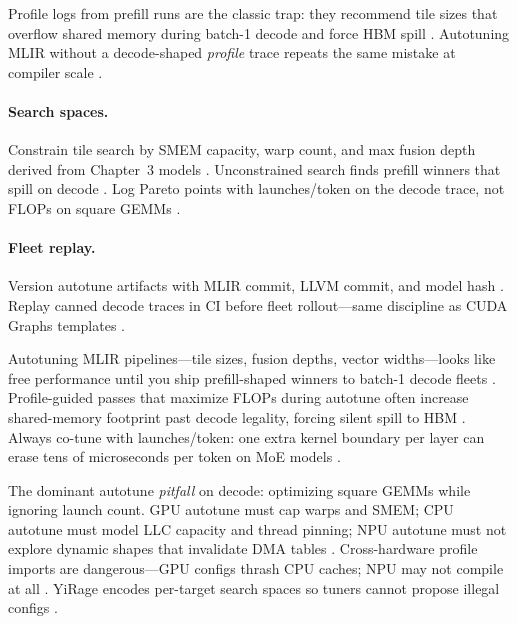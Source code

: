Profile logs from prefill runs are the classic trap: they recommend tile sizes that overflow shared memory during batch-1 decode and force HBM spill \citep{memoryfloor2026,semianalysis2024tma}. Autotuning MLIR without a decode-shaped \emph{profile} trace repeats the same mistake at compiler scale \citep{taxbreak2026,chen2020compilerbasedhardw}.
\label{sec:ch14_mlir_tuning}

\paragraph{Search spaces.} Constrain tile search by SMEM capacity, warp count, and max fusion depth derived from Chapter~3 models \citep{nvidia2022hopper,amd2024xdna,yirage2026}. Unconstrained search finds prefill winners that spill on decode \citep{memoryfloor2026,semianalysis2024tma}. Log Pareto points with launches/token on the decode trace, not FLOPs on square GEMMs \citep{taxbreak2026,patel2025llminference}.

\paragraph{Fleet replay.} Version autotune artifacts with MLIR commit, LLVM commit, and model hash \citep{chen2020compilerbasedhardw,liu2024deepseekv3}. Replay canned decode traces in CI before fleet rollout---same discipline as CUDA Graphs templates \citep{nvidia2024cudagraphs,memoryfloor2026,taxbreak2026}.

Autotuning MLIR pipelines---tile sizes, fusion depths, vector widths---looks like free performance until you ship prefill-shaped winners to batch-1 decode fleets \citep{memoryfloor2026,chen2020compilerbasedhardw}. Profile-guided passes that maximize FLOPs during autotune often increase shared-memory footprint past decode legality, forcing silent spill to HBM \citep{taxbreak2026,semianalysis2024tma}. Always co-tune with launches/token: one extra kernel boundary per layer can erase tens of microseconds per token on MoE models \citep{liu2024deepseekv3,taxbreak2026}.

The dominant autotune \emph{pitfall} on decode: optimizing square GEMMs while ignoring launch count. GPU autotune must cap warps and SMEM; CPU autotune must model LLC capacity and thread pinning; NPU autotune must not explore dynamic shapes that invalidate DMA tables \citep{amd2024xdna,dlbook}. Cross-hardware profile imports are dangerous---GPU configs thrash CPU caches; NPU may not compile at all \citep{kwon2023vllm,yirage2026}. YiRage encodes per-target search spaces so tuners cannot propose illegal configs \citep{yirage2026,patel2025llminference}.

